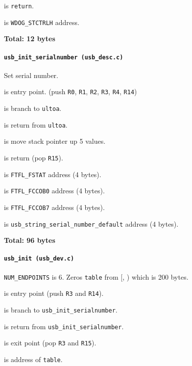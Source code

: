  is \texttt{return}.

 is \texttt{WDOG\_STCTRLH} address.

\textbf{Total: 12 bytes}

\paragraph{\texttt{usb\_init\_serialnumber (usb\_desc.c)}} Set serial number.

 is entry point.
(push \texttt{R0}, \texttt{R1}, \texttt{R2}, \texttt{R3},
\texttt{R4}, \texttt{R14})

 is branch to \texttt{ultoa}.

 is return from \texttt{ultoa}.

 is move stack pointer up 5 values.

 is return (pop \texttt{R15}).

\vspace{1em}

 is \texttt{FTFL\_FSTAT} address (4 bytes).

 is \texttt{FTFL\_FCCOB0} address (4 bytes).

 is \texttt{FTFL\_FCCOB7} address (4 bytes).

 is {\tiny
\texttt{usb\_string\_serial\_number\_default}} address (4 bytes).

\textbf{Total: 96 bytes}

\paragraph{\texttt{usb\_init (usb\_dev.c)}} \texttt{NUM\_ENDPOINTS} is 6.
Zeros \texttt{table} from [,
) which is 200 bytes.

 is entry point (push \texttt{R3} and \texttt{R14}).

 is branch to \texttt{usb\_init\_serialnumber}.

 is return from \texttt{usb\_init\_serialnumber}.

 is exit point (pop \texttt{R3} and \texttt{R15}).

 is address of \texttt{table}.

